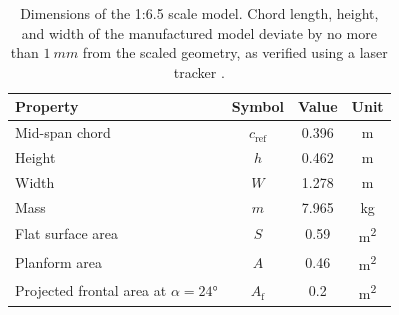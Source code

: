 \documentclass[wes, manuscript]{copernicus}
\begin{document}
\begin{table}[htp]
    \caption{Dimensions of the 1:6.5 scale model. Chord length, height, and width of the manufactured model deviate by no more than $1~\unit{mm}$ from the scaled geometry, as verified using a laser tracker \citep{Poland2025a}.}
    \centering
    \begin{tabular}{l c c c}
        \hline
        \textbf{Property} & \textbf{Symbol} & \textbf{Value} & \textbf{Unit} \\
        \hline
        Mid-span chord & $c_{\textrm{ref}}$ & 0.396 & \unit{m} \\
        Height & $h$ & 0.462 & \unit{m} \\
        Width & $W$ & 1.278 & \unit{m} \\
        Mass & $m$ & 7.965 & \unit{kg} \\
        Flat surface area & $S$ & 0.59 & \unit{m^2} \\
        Planform area & $A$ & 0.46 & \unit{m^2} \\
        Projected frontal area at $\alpha=24\unit{\degree}$ & $A_{\textrm{f}}$ & 0.2 & \unit{m^2} \\
        \hline
    \end{tabular}
    \label{tab:scale_model_properties}
\end{table}
%
\end{document}
